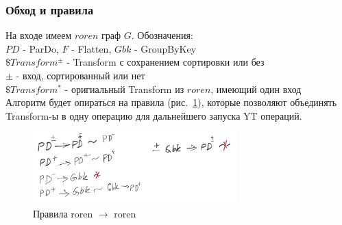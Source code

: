 \subsubsection{Обход и правила}

На входе имеем $roren$ граф $G$. Обозначения:\\
$PD$ - ParDo, $F$ - Flatten, $Gbk$ - GroupByKey\\
$\$Transform^{\pm}$ -  Transform с сохранением сортировки или без\\
$\pm$ - вход, сортированный или нет\\
$\$Transform^{*}$ - оригиальный Transform из $roren$, имеющий один вход\\
Алгоритм будет опираться на правила (рис.~\ref{fig:rule1}), которые позволяют объединять Transform-ы в одну операцию для дальнейшего запуска YT операций.\\
\begin{figure}[h]
    \centering
    \includegraphics[width=0.7\textwidth]{img/rule1.jpeg}
    \caption{Правила roren $\xrightarrow{}$ roren}
    \label{fig:rule1}
\end{figure}

